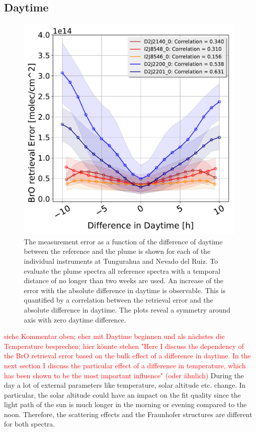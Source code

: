 \subsection{ Daytime \label{chap:daytime}}
	\begin{figure}
	\centering
	\includegraphics[width=0.7\linewidth]{Bilder/DiffDaytimeallInstruments}
	\caption{The  measurement error as a function of the difference of daytime between the reference and the plume is shown for each of the individual instruments at Tungurahua and Nevado del Ruiz. To evaluate the plume spectra all reference spectra with a temporal distance of no longer than two weeks are used. An increase of the  error with the absolute difference in daytime is observable. This is quantified by a correlation between the  retrieval error and the absolute difference in daytime. The plots reveal a symmetry around axis with zero daytime difference. }
	\label{fig:diffdaytime}
\end{figure}
\textcolor{red}{siehe Kommentar oben; eher mit Daytime beginnen und als nächstes die Temperature besprechen; hier könnte stehen "Here I discuss the dependency of the BrO retrieval error based on the bulk effect of a difference in daytime. In the next section I discuss the particular effect of a difference in temperature, which has been shown to be the most important influence" (oder ähnlich) }
During the day a lot of external parameters like temperature, solar altitude etc. change. In particular, the solar altitude could have an impact on the fit quality since the light path of the sun is much longer in the morning or evening compared to the noon. Therefore, the scattering effects and the Fraunhofer structures are different for both spectra.\\

